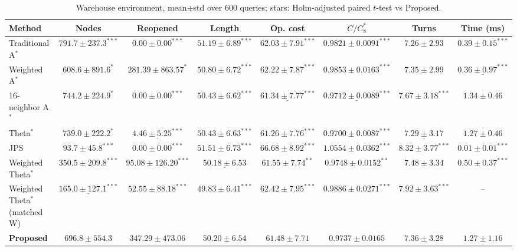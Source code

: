 \begin{table}[htbp]
\centering\small
\caption{Warehouse environment, mean$\pm$std over 600 queries; stars: Holm-adjusted paired $t$-test vs Proposed.}\label{tab:main_warehouse}
\begin{tabular}{lccccccc}
\toprule
Method & Nodes & Reopened & Length & Op. cost & $C/C^*_8$ & Turns & Time (ms) \\
\midrule
Traditional A$^{*}$ & $791.7\pm237.3^{***}$ & $\mathbf{0.00\pm0.00^{***}}$ & $51.19\pm6.89^{***}$ & $62.03\pm7.91^{***}$ & $0.9821\pm0.0091^{***}$ & $\mathbf{7.26\pm2.93}$ & $0.39\pm0.15^{***}$ \\
Weighted A$^{*}$ & $608.6\pm891.6^{*}$ & $281.39\pm863.57^{*}$ & $50.80\pm6.72^{***}$ & $62.22\pm7.87^{***}$ & $0.9853\pm0.0163^{***}$ & $7.35\pm2.99$ & $\underline{0.36\pm0.97^{***}}$ \\
16-neighbor A$^{*}$ & $744.2\pm224.9^{*}$ & $\mathbf{0.00\pm0.00^{***}}$ & $50.43\pm6.62^{***}$ & $\underline{61.34\pm7.77^{***}}$ & $\underline{0.9712\pm0.0089^{***}}$ & $7.67\pm3.18^{***}$ & $1.34\pm0.46$ \\
Theta$^{*}$ & $739.0\pm222.2^{*}$ & $\underline{4.46\pm5.25^{***}}$ & $50.43\pm6.63^{***}$ & $\mathbf{61.26\pm7.76^{***}}$ & $\mathbf{0.9700\pm0.0087^{***}}$ & $\underline{7.29\pm3.17}$ & $1.27\pm0.46$ \\
JPS & $\mathbf{93.7\pm45.8^{***}}$ & $\mathbf{0.00\pm0.00^{***}}$ & $51.51\pm6.73^{***}$ & $66.68\pm8.92^{***}$ & $1.0554\pm0.0362^{***}$ & $8.32\pm3.77^{***}$ & $\mathbf{0.01\pm0.01^{***}}$ \\
Weighted Theta$^{*}$ & $350.5\pm209.8^{***}$ & $95.08\pm126.20^{***}$ & $\underline{50.18\pm6.53}$ & $61.55\pm7.74^{**}$ & $0.9748\pm0.0152^{**}$ & $7.48\pm3.34$ & $0.50\pm0.37^{***}$ \\
Weighted Theta$^{*}$ (matched W) & $\underline{165.0\pm127.1^{***}}$ & $52.55\pm88.18^{***}$ & $\mathbf{49.83\pm6.41^{***}}$ & $62.42\pm7.95^{***}$ & $0.9886\pm0.0271^{***}$ & $7.92\pm3.63^{***}$ & -- \\
\textbf{Proposed} & $696.8\pm554.3$ & $347.29\pm473.06$ & $50.20\pm6.54$ & $61.48\pm7.71$ & $0.9737\pm0.0165$ & $7.36\pm3.28$ & $1.27\pm1.16$ \\
\bottomrule
\end{tabular}
\end{table}
